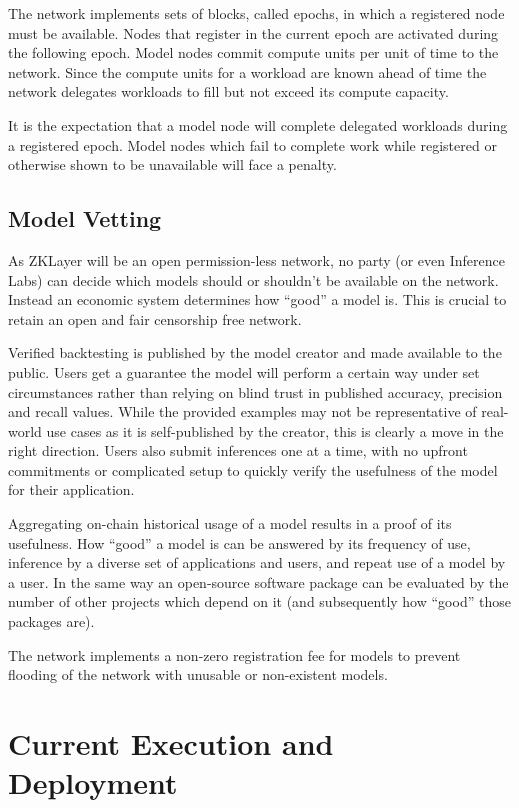 \documentclass[conference]{IEEEtran}
\begin{document}
The network implements sets of blocks, called epochs, in which a registered node must be available. Nodes that register in the current epoch are activated during the following epoch. Model nodes commit compute units per unit of time to the network. Since the compute units for a workload are known ahead of time the network delegates workloads to fill but not exceed its compute capacity.

It is the expectation that a model node will complete delegated workloads during a registered epoch. Model nodes which fail to complete work while registered or otherwise shown to be unavailable will face a penalty.

\subsection{Model Vetting}

As ZKLayer will be an open permission-less network, no party (or even Inference Labs) can decide which models should or shouldn’t be available on the network. Instead an economic system determines how “good” a model is. This is crucial to retain an open and fair censorship free network.

Verified backtesting is published by the model creator and made available to the public. Users get a guarantee the model will perform a certain way under set circumstances rather than relying on blind trust in published accuracy, precision and recall values. While the provided examples may not be representative of real-world use cases as it is self-published by the creator, this is clearly a move in the right direction. Users also submit inferences one at a time, with no upfront commitments or complicated setup to quickly verify the usefulness of the model for their application.

Aggregating on-chain historical usage of a model results in a proof of its usefulness. How “good” a model is can be answered by its frequency of use, inference by a diverse set of applications and users, and repeat use of a model by a user. In the same way an open-source software package can be evaluated by the number of other projects which depend on it (and subsequently how “good” those packages are).

The network implements a non-zero registration fee for models to prevent flooding of the network with unusable or non-existent models.


\section{Current Execution and Deployment}
\end{document}
